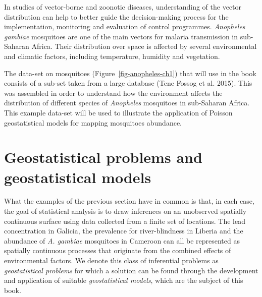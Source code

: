 \documentclass[
  letterpaper,
]{krantz}
\begin{document}
In studies of vector-borne and zoonotic diseases, understanding of the
vector distribution can help to better guide the decision-making process
for the implementation, monitoring and evaluation of control programmes.
\emph{Anopheles gambiae} mosquitoes are one of the main vectors for
malaria transmission in sub-Saharan Africa. Their distribution over
space is affected by several environmental and climatic factors,
including temperature, humidity and vegetation.

The data-set on mosquitoes (Figure~\ref{fig-anopheles-ch1}) that will
use in the book consists of a sub-set taken from a large database (Tene
Fossog et al. 2015). This was assembled in order to understand how the
environment affects the distribution of different species of
\emph{Anopheles} mosquitoes in sub-Saharan Africa. This example data-set
will be used to illustrate the application of Poisson geostatistical
models for mapping mosquitoes abundance.

\hypertarget{sec-geostat-models}{%
\section{Geostatistical problems and geostatistical
models}\label{sec-geostat-models}}

What the examples of the previous section have in common is that, in
each case, the goal of statistical analysis is to draw inferences on an
unobserved spatially continuous surface using data collected from a
finite set of locations. The lead concentration in Galicia, the
prevalence for river-blindness in Liberia and the abundance of \emph{A.
gambiae} mosquitoes in Cameroon can all be represented as spatially
continuous processes that originate from the combined effects of
environmental factors. We denote this class of inferential problems as
\emph{geostatistical problems} for which a solution can be found through
the development and application of suitable \emph{geostatistical
models}, which are the subject of this book.
\end{document}
